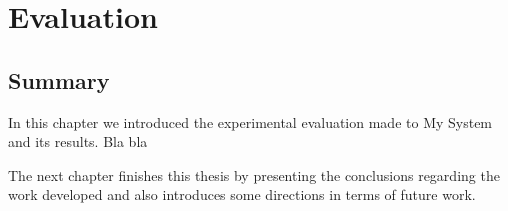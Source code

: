 \chapter{Evaluation}
\label{sec:evaluation}

 \section*{Summary}

In this chapter we introduced the experimental evaluation made to My
System  and its results. Bla bla

The next chapter finishes this thesis by presenting the conclusions
regarding the work developed and also introduces some directions in
terms of future work.
  
 
